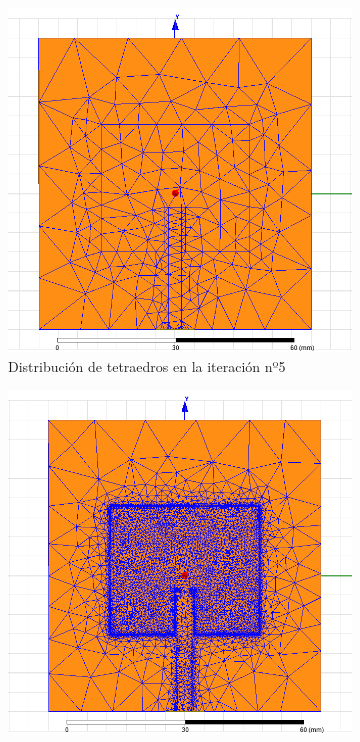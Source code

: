 \begin{figure}[H]
     \centering
     
     \begin{subfigure}[b]{0.4\textwidth}
         \centering
         \includegraphics[width=\textwidth]{archivos/desarrollo/10a}
         \caption{Distribución de tetraedros en la iteración nº5}
         \label{fig:tetraa}
     \end{subfigure}
     \linebreak
     \begin{subfigure}[b]{0.4\textwidth}
         \centering
         \includegraphics[width=\textwidth]{archivos/desarrollo/10b}

\end{subfigure}
\end{figure}

